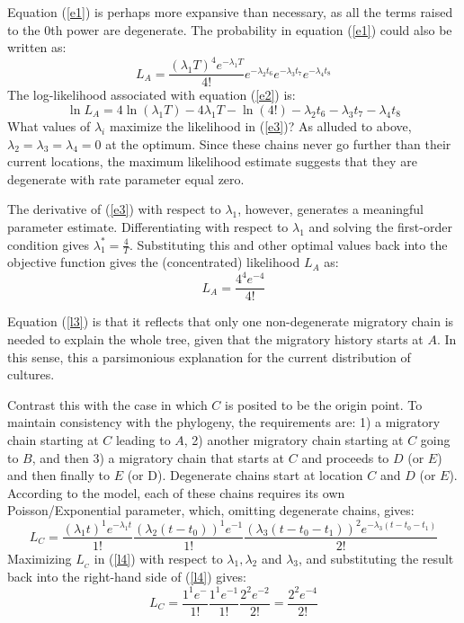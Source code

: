 \documentclass[11pt]{article}
\begin{document}
Equation (\ref{e1}) is perhaps more expansive than necessary, as all the terms raised to the $0$th power are degenerate. The probability in equation (\ref{e1}) could also be written as:
\begin{equation} \label{e2}
L_A = \frac{(\lambda_1 T)^4e^{-\lambda_1T}}{4!}e^{-\lambda_2t_6}e^{-\lambda_3t_7}e^{-\lambda_4t_8}
\end{equation} 
The log-likelihood associated with equation (\ref{e2}) is:
\begin{equation} \label{e3}
\ln L_A  = 4\ln(\lambda_1 T) -4\lambda_1T-\ln(4!)-\lambda_2t_6-\lambda_3t_7-\lambda_4t_8
\end{equation} 
What values of $\lambda_i$ maximize the likelihood in (\ref{e3})? As alluded to above, $\lambda_2=\lambda_3=\lambda_4=0$ at the optimum. Since these chains never go further than their current locations, the maximum likelihood estimate suggests that they are degenerate with rate parameter equal zero. 

The derivative of (\ref{e3}) with respect to $\lambda_1$, however, generates a meaningful parameter estimate. Differentiating with respect to $\lambda_1$ and solving the first-order condition gives $\lambda_1^*=\frac{4}{T}$. Substituting this and other optimal values back into the objective function gives the (concentrated) likelihood $L_A$ as:
\begin{equation}  \label{l3}
L_A=\frac{4^4e^{-4}}{4!}
\end{equation}

Equation (\ref{l3}) is that it reflects that only one non-degenerate migratory chain is needed to explain the whole tree, given that the migratory history starts at $A$. In this sense, this a parsimonious explanation for the current distribution of cultures. 

Contrast this with the case in which $C$ is posited to be the origin point. To maintain consistency with the phylogeny, the requirements are:  1) a migratory chain starting at $C$ leading to $A$, 2) another migratory chain starting at $C$ going to $B$, and then 3) a migratory chain that starts at $C$ and proceeds to $D$ (or $E$) and then finally to $E$ (or D). Degenerate chains start at location $C$ and $D$ (or $E$). According to the model, each of these chains requires its own Poisson/Exponential parameter, which, omitting degenerate chains, gives:
\begin{equation} \label{l4}
L_{C}=\frac{(\lambda_1t)^1e^{-\lambda_1t}}{1!}\frac{(\lambda_2(t-t_0))^1e^{-1}}{1!}
\frac{(\lambda_3(t-t_0-t_1))^2e^{-\lambda_3(t-t_0-t_1)}}{2!}
\end{equation} 
Maximizing $L_{}_{C}$ in (\ref{l4}) with respect to $\lambda_1,\lambda_2$ and $\lambda_3$, and substituting the result back into the right-hand side of (\ref{l4}) gives:
\begin{equation} \label{l5}
L_{C}=\frac{1^1e^{-}}{1!}\frac{1^{1}e^{-1}}{1!}\frac{2^2e^{-2}}{2!}=
\frac{2^2e^{-4}}{2!}
\end{equation} 
\end{document}

